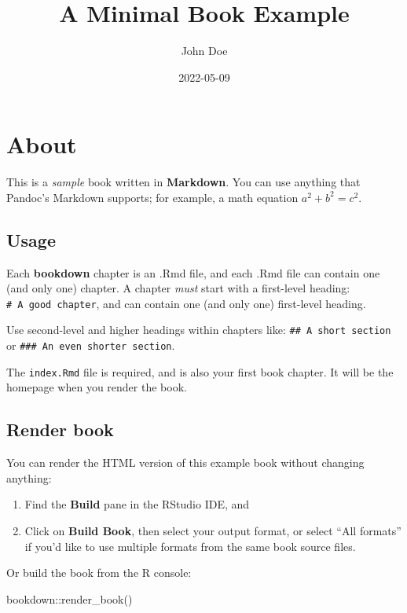 \documentclass[
]{book}
\title{A Minimal Book Example}
\author{John Doe}
\date{2022-05-09}
\newenvironment{Shaded}{\begin{snugshade}}{\end{snugshade}}
\newcommand{\FunctionTok}[1]{\textcolor[rgb]{0.00,0.00,0.00}{#1}}
\newcommand{\NormalTok}[1]{#1}
\newcommand{\SpecialCharTok}[1]{\textcolor[rgb]{0.00,0.00,0.00}{#1}}
\theoremstyle{definition}
\theoremstyle{definition}
\theoremstyle{definition}
\theoremstyle{definition}
\theoremstyle{remark}
\begin{document}
\maketitle

{
\setcounter{tocdepth}{1}
\tableofcontents
}
\hypertarget{about}{%
\chapter{About}\label{about}}

This is a \emph{sample} book written in \textbf{Markdown}. You can use anything that Pandoc's Markdown supports; for example, a math equation \(a^2 + b^2 = c^2\).

\hypertarget{usage}{%
\section{Usage}\label{usage}}

Each \textbf{bookdown} chapter is an .Rmd file, and each .Rmd file can contain one (and only one) chapter. A chapter \emph{must} start with a first-level heading: \texttt{\#\ A\ good\ chapter}, and can contain one (and only one) first-level heading.

Use second-level and higher headings within chapters like: \texttt{\#\#\ A\ short\ section} or \texttt{\#\#\#\ An\ even\ shorter\ section}.

The \texttt{index.Rmd} file is required, and is also your first book chapter. It will be the homepage when you render the book.

\hypertarget{render-book}{%
\section{Render book}\label{render-book}}

You can render the HTML version of this example book without changing anything:

\begin{enumerate}
\def\labelenumi{\arabic{enumi}.}
\item
  Find the \textbf{Build} pane in the RStudio IDE, and
\item
  Click on \textbf{Build Book}, then select your output format, or select ``All formats'' if you'd like to use multiple formats from the same book source files.
\end{enumerate}

Or build the book from the R console:

\begin{Shaded}
\begin{Highlighting}[]
\NormalTok{bookdown}\SpecialCharTok{::}\FunctionTok{render\_book}\NormalTok{()}
\end{Highlighting}
\end{Shaded}
\end{document}
